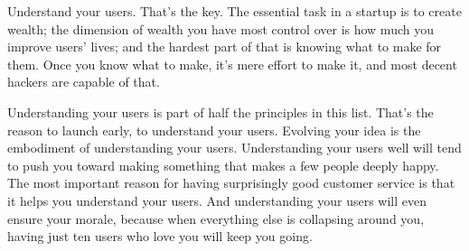 Understand your users. That's the key. The essential task in a startup
is to create wealth; the dimension of wealth you have most control over
is how much you improve users' lives; and the hardest part of that is
knowing what to make for them. Once you know what to make, it's mere
effort to make it, and most decent hackers are capable of that.

Understanding your users is part of half the principles in this list.
That's the reason to launch early, to understand your users. Evolving
your idea is the embodiment of understanding your users. Understanding
your users well will tend to push you toward making something that makes
a few people deeply happy. The most important reason for having
surprisingly good customer service is that it helps you understand your
users. And understanding your users will even ensure your morale,
because when everything else is collapsing around you, having just ten
users who love you will keep you going.